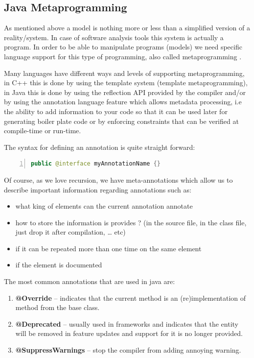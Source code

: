 		
\subsection{Java Metaprogramming}

	
	As mentioned above a model is nothing more or less than a simplified version of
a reality/system. In case of software analysis tools this system is actually a
program. In order to be able to manipulate programs (models) we need specific
language support for this type of programming, also called metaprogramming
\cite{website:metaprogramming}. 

	Many languages have different ways and levels of supporting metaprogramming,
in C++ this is done by using the template system (template metaprogramming), in
Java this is done by using the reflection API provided by the compiler and/or by using the annotation
language feature which allows metadata processing, i.e the ability to add
information to your code so that it can be used later for generating boiler
plate code or by enforcing constraints that can be verified at compile-time or
run-time. \cite{book:ThinkingInJava} 
	
	The syntax for defining an annotation is quite straight forward:
	\small
	\begin{lstlisting}[language=Java,numbers=left]
		public @interface myAnnotationName {}
	\end{lstlisting}
	\normalsize{}
	Of course, as we love recursion, we have meta-annotations which allow us to
describe important information regarding annotations such as:
	\begin{itemize}
	 	\item what king of elements can the current annotation annotate
	 	\item how to store the information is provides ? (in the source file, in the
class file, just drop it after compilation, \ldots{} etc)
	 	\item if it can be repeated more than one time on the same element
	 	\item if the element is  documented
	\end{itemize}
	
	The most common annotations that are used in java are:
	\begin{enumerate}
	  \item \textbf{@Override} -- indicates that the current method is an
 (re)implementation of method from the base class.
  
	  \item \textbf{@Deprecated} -- usually used in frameworks and indicates that
	  the entity will be removed in feature updates and support for it is no longer
 provided.
 
	  \item \textbf{@SuppressWarnings} -- stop the compiler from adding annoying
 warning.
	\end{enumerate}	
	
